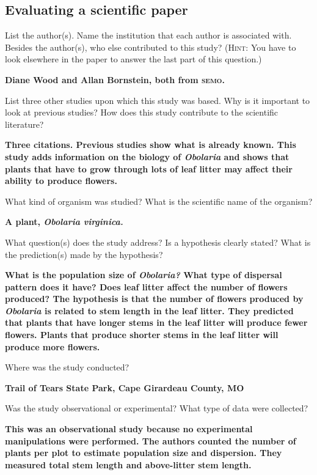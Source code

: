 \documentclass[12pt, hidelinks]{exam}
\newcommand*\AnswerBox[2]{%
    \parbox[t][#1]{0.92\textwidth}{%
    \vspace{-0.5\baselineskip}\begin{solution}\textbf{#2}\end{solution}}
    \vspace{\stretch{1}}
}
\newlength{\basespace}
\begin{document}
\subsection*{Evaluating a scientific paper}

\begin{questions}

\question
List the author(s). Name the institution that each author is associated with. 
Besides the author(s), who else contributed to this study? (\textsc{Hint:} You have to look elsewhere in the paper to answer the last part of this question.)

\AnswerBox{3\baselineskip}{%
Diane Wood and Allan Bornstein, both from \textsc{semo}.
}

\question
List three other studies upon which this study was based. Why is it important to look at previous studies? How does this study contribute to the scientific literature?

\AnswerBox{1.75\basespace}{%
Three citations. Previous studies show what is already known. This study adds information on the biology of \textit{Obolaria} and shows that plants that have to grow through lots of leaf litter may affect their ability to produce flowers.
}

\question
What kind of organism was studied? What is the scientific name of the organism? 

\AnswerBox{2\baselineskip}{A plant, \textit{Obolaria virginica.}}


\question
What question(s) does the study address? Is a hypothesis
clearly stated? What is the prediction(s) made by the hypothesis?

\AnswerBox{1.75\basespace}{What is the population size of \textit{Obolaria?} What type of dispersal pattern does it have? Does leaf litter affect the number of flowers produced? The hypothesis is that the number of flowers produced by \textit{Obolaria} is related to stem length in the leaf litter. They predicted that plants that have longer stems in the leaf litter will produce fewer flowers. Plants that produce shorter stems in the leaf litter will produce more flowers. }

\question
Where was the study conducted?

\AnswerBox{2\baselineskip}{Trail of Tears State Park, Cape Girardeau County, MO}

\question
Was the study observational or experimental? What type of data were collected? 

\AnswerBox{\basespace}{This was an observational study because no experimental manipulations were performed. The authors counted the number of plants per plot to estimate population size and dispersion. They measured total stem length and above-litter stem length.}


\end{questions}
\end{document}
